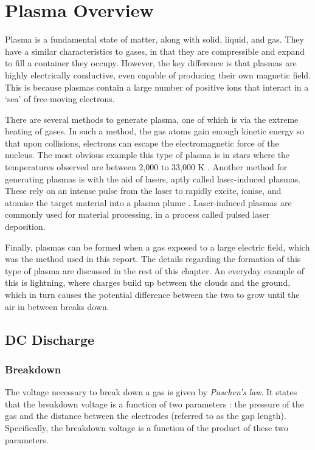 \chapter{Plasma Overview}
\label{ch:plasma_overview}

Plasma is a fundamental state of matter, along with solid, liquid, and gas. They have a similar characteristics to gases, in that they are compressible and expand to fill a container they occupy. However, the key difference is that plasmas are highly electrically conductive, even capable of producing their own magnetic field. This is because plasmas contain a large number of positive ions that interact in a `sea' of free-moving electrons.

There are several methods to generate plasma, one of which is via the extreme heating of gases. In such a method, the gas atoms gain enough kinetic energy so that upon collisions, electrons can escape the electromagnetic force of the nucleus. The most obvious example this type of plasma is in stars where the temperatures observed are between 2,000 to 33,000 K \cite{mahy2024basicstellarobservables}.  Another method for generating plasmas is with the aid of lasers, aptly called laser-induced plasmas. These rely on an intense pulse from the laser to rapidly excite, ionise, and atomise the target material into a plasma plume \cite{Chaudhary16}. Laser-induced plasmas are commonly used for material processing, in a process called pulsed laser deposition. 

Finally, plasmas can be formed when a gas exposed to a large electric field, which was the method used in this report. The details regarding the formation of this type of plasma are discussed in the rest of this chapter. An everyday example of this is lightning, where charges build up between the clouds and the ground, which in turn causes the potential difference between the two to grow until the air in between breaks down.

\section{DC Discharge}
\subsection{Breakdown}
\label{sec:paschens_law}

The voltage necessary to break down a gas is given by \textit{Paschen's law}. It states that the breakdown voltage is a function of two parameters \cite{Lieberman2005}: the pressure of the gas and the distance between the electrodes (referred to as the gap length). Specifically, the breakdown voltage is a function of the product of these two parameters.


